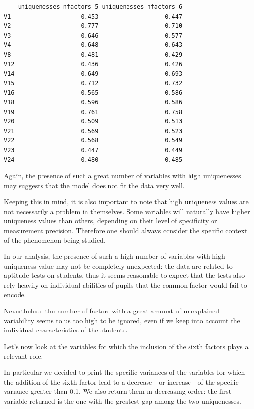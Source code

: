 \documentclass[
  letterpaper,
  DIV=11,
  numbers=noendperiod]{scrartcl}
\begin{document}
\begin{verbatim}
    uniquenesses_nfactors_5 uniquenesses_nfactors_6
V1                    0.453                   0.447
V2                    0.777                   0.710
V3                    0.646                   0.577
V4                    0.648                   0.643
V8                    0.481                   0.429
V12                   0.436                   0.426
V14                   0.649                   0.693
V15                   0.712                   0.732
V16                   0.565                   0.586
V18                   0.596                   0.586
V19                   0.761                   0.758
V20                   0.509                   0.513
V21                   0.569                   0.523
V22                   0.568                   0.549
V23                   0.447                   0.449
V24                   0.480                   0.485
\end{verbatim}

Again, the presence of such a great number of variables with high
uniquenesses may suggests that the model does not fit the data very
well.

Keeping this in mind, it is also important to note that high uniqueness
values are not necessarily a problem in themselves. Some variables will
naturally have higher uniqueness values than others, depending on their
level of specificity or measurement precision. Therefore one should
always consider the specific context of the phenomenon being studied.

In our analysis, the presence of such a high number of variables with
high uniqueness value may not be completely unexpected: the data are
related to aptitude tests on students, thus it seems reasonable to
expect that the tests also rely heavily on individual abilities of
pupils that the common factor would fail to encode.

Nevertheless, the number of factors with a great amount of unexplained
variability seems to us too high to be ignored, even if we keep into
account the individual characteristics of the students.

Let's now look at the variables for which the inclusion of the sixth
factors plays a relevant role.

In particular we decided to print the specific variances of the
variables for which the addition of the sixth factor lead to a decrease
- or increase - of the specific variance greater than 0.1. We also
return them in decreasing order: the first variable returned is the one
with the greatest gap among the two uniquenesses.
\end{document}
